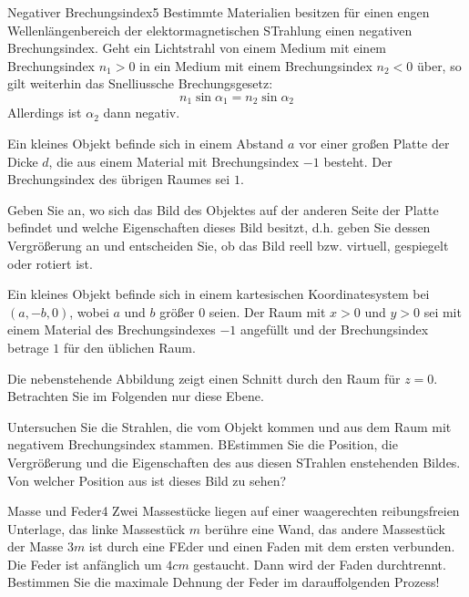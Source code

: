 \begin{problem}{Negativer Brechungsindex}{5}
Bestimmte Materialien besitzen für einen engen Wellenlängenbereich der elektormagnetischen STrahlung einen negativen Brechungsindex.  Geht ein Lichtstrahl von einem Medium mit einem Brechungsindex $n_1>0$ in ein Medium mit einem Brechungsindex $n_2<0$ über, so gilt weiterhin das Snelliussche Brechungsgesetz:
\begin{equation*}
  n_1\sin{\alpha_1}=n_2\sin{\alpha_2}
\end{equation*}
Allerdings ist $\alpha_2$ dann negativ.
\begin{abcenum}
  \item Ein kleines Objekt befinde sich in einem Abstand $a$ vor einer großen Platte der Dicke $d$, die aus einem Material mit Brechungsindex $-1$ besteht.  Der Brechungsindex des übrigen Raumes sei $1$.

Geben Sie an, wo sich das Bild des Objektes auf der anderen Seite der Platte befindet und welche Eigenschaften dieses Bild besitzt, d.h. geben Sie dessen Vergrößerung an und entscheiden Sie, ob das Bild reell bzw. virtuell, gespiegelt oder rotiert ist.
  \item Ein kleines Objekt befinde sich in einem kartesischen Koordinatesystem bei $(a,-b,0)$, wobei $a$ und $b$ größer $0$ seien.  Der Raum mit $x>0$ und $y>0$ sei mit einem Material des Brechungsindexes $-1$ angefüllt und der Brechungsindex betrage $1$ für den üblichen Raum.

Die nebenstehende Abbildung zeigt einen Schnitt durch den Raum für $z=0$.  Betrachten Sie im Folgenden nur diese Ebene.

Untersuchen Sie die Strahlen, die vom Objekt kommen und aus dem Raum mit negativem Brechungsindex stammen.  BEstimmen Sie die Position, die Vergrößerung und die Eigenschaften des aus diesen STrahlen enstehenden Bildes.  Von welcher Position aus ist dieses Bild zu sehen?
\end{abcenum}
  \begin{solution}
    
  \end{solution}
\end{problem}

\begin{problem}{Masse und Feder}{4}
  Zwei Massestücke liegen auf einer waagerechten reibungsfreien Unterlage, das linke Massestück $m$ berühre eine Wand, das andere Massestück der Masse $3m$ ist durch eine FEder und einen Faden mit dem ersten verbunden.  Die Feder ist anfänglich um $4\unit{cm}$ gestaucht.  Dann wird der Faden durchtrennt.  Bestimmen Sie die maximale Dehnung der Feder im darauffolgenden Prozess!
  \begin{solution}
    
  \end{solution}
\end{problem}

